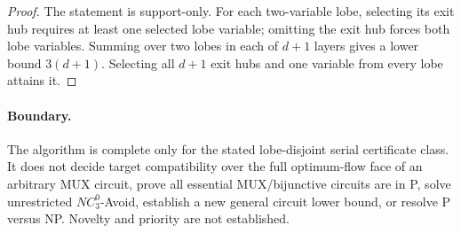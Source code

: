 \documentclass[11pt]{article}
\begin{document}
\begin{proof}
The statement is support-only.  For each two-variable lobe, selecting its exit hub
requires at least one selected lobe variable; omitting the exit hub forces both lobe
variables.  Summing over two lobes in each of $d+1$ layers gives a lower bound
$3(d+1)$.  Selecting all $d+1$ exit hubs and one variable from every lobe attains it.
\end{proof}

\paragraph{Boundary.}
The algorithm is complete only for the stated lobe-disjoint serial certificate class.
It does not decide target compatibility over the full optimum-flow face of an arbitrary
MUX circuit, prove all essential MUX/bijunctive circuits are in P, solve unrestricted
$NC^0_3$-Avoid, establish a new general circuit lower bound, or resolve P versus NP.
Novelty and priority are not established.
\end{document}
